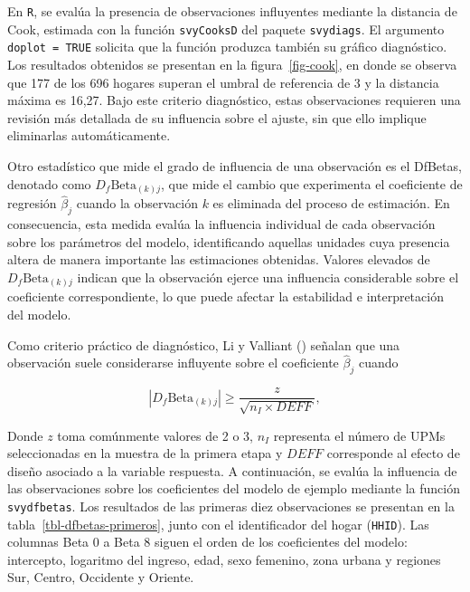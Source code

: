 \documentclass[
  spanish,
  11pt,
  letterpaper,
  oneside,
  open=any]{scrbook}
\begin{document}
En \texttt{R}, se evalúa la presencia de observaciones influyentes
mediante la distancia de Cook, estimada con la función
\texttt{svyCooksD} del paquete \texttt{svydiags}. El argumento
\texttt{doplot\ =\ TRUE} solicita que la función produzca también su
gráfico diagnóstico. Los resultados obtenidos se presentan en la
figura~\ref{fig-cook}, en donde se observa que 177 de los 696 hogares
superan el umbral de referencia de 3 y la distancia máxima es 16,27.
Bajo este criterio diagnóstico, estas observaciones requieren una
revisión más detallada de su influencia sobre el ajuste, sin que ello
implique eliminarlas automáticamente.

Otro estadístico que mide el grado de influencia de una observación es
el DfBetas, denotado como \(D_f\text{Beta}_{(k)j}\), que mide el cambio
que experimenta el coeficiente de regresión \(\hat{\beta}_{j}\) cuando
la observación \(k\) es eliminada del proceso de estimación. En
consecuencia, esta medida evalúa la influencia individual de cada
observación sobre los parámetros del modelo, identificando aquellas
unidades cuya presencia altera de manera importante las estimaciones
obtenidas. Valores elevados de \(D_f\text{Beta}_{(k)j}\) indican que la
observación ejerce una influencia considerable sobre el coeficiente
correspondiente, lo que puede afectar la estabilidad e interpretación
del modelo.

Como criterio práctico de diagnóstico, Li y Valliant
() señalan que una observación
suele considerarse influyente sobre el coeficiente \(\hat{\beta}_{j}\)
cuando

\[
\left|D_f\text{Beta}_{(k)j}\right|
\geq
\frac{z}{\sqrt{n_I\times DEFF}},
\]

Donde \(z\) toma comúnmente valores de 2 o 3, \(n_I\) representa el
número de UPMs seleccionadas en la muestra de la primera etapa y
\(DEFF\) corresponde al efecto de diseño asociado a la variable
respuesta. A continuación, se evalúa la influencia de las observaciones
sobre los coeficientes del modelo de ejemplo mediante la función
\texttt{svydfbetas}. Los resultados de las primeras diez observaciones
se presentan en la tabla~\ref{tbl-dfbetas-primeros}, junto con el
identificador del hogar (\texttt{HHID}). Las columnas Beta 0 a Beta 8
siguen el orden de los coeficientes del modelo: intercepto, logaritmo
del ingreso, edad, sexo femenino, zona urbana y regiones Sur, Centro,
Occidente y Oriente.
\end{document}
